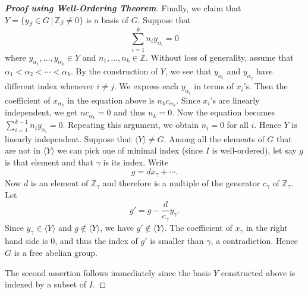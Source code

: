 \begin{proof}[\textbf{Proof using Well-Ordering Theorem}]
	Finally, we claim that $Y = \{y_\beta\in G\,|\, \mathbb{Z}_\beta \neq 0\}$ is a basis of $G$. Suppose that $$\sum_{i=1}^k n_{i}y_{\alpha_i} = 0$$
	where $y_{\alpha_1}, \dots, y_{\alpha_k}\in Y$ and $n_1,\dots, n_k\in\mathbb{Z}$. Without loss of generality, assume that $\alpha_1<\alpha_2<\cdots < \alpha_k$. By the construction of $Y$, we see that $y_{\alpha_i}$ and $y_{\alpha_j}$ have different index whenever $i\neq j$. We express each $y_{\alpha_i}$ in terms of $x_i$'s. Then the coefficient of $x_{\alpha_k}$ in the equation above is $n_kc_{\alpha_k}$. Since $x_i$'s are linearly independent, we get $nc_{\alpha_k} = 0$ and thus $n_k = 0$. Now the equation becomes $\sum_{i=1}^{k-1} n_{i}y_{\alpha_i} = 0$. Repeating this argument, we obtain $n_i = 0$ for all $i$.  Hence $Y$ is linearly independent. Suppose that  $\langle Y\rangle \ne G$. Among all the elements of $G$ that are not in $\langle Y\rangle$ we can pick one of minimal index (since $I$ is well-ordered), let say $g$ is that element and that $\gamma$ is its index. Write
	\[ g = d x_\gamma + \cdots. \]
	Now $d$ is an element of $\mathbb{Z}_\gamma$ and therefore is a multiple of the generator $c_{\gamma}$ of $\mathbb{Z}_\gamma$. Let 
	\begin{equation*}
		g' = g - \frac{d}{c_{\gamma}}y_\gamma.
	\end{equation*}  Since $y_\gamma \in \langle Y\rangle$ and $g\not\in \langle Y\rangle$, we have $g'\not\in \langle Y\rangle$. The coefficient of $x_\gamma$ in the right hand side is $0$, and thus the index of $g'$ is smaller than $\gamma$, a contradiction. Hence $G$ is a free abelian group. 
	
	The second assertion follows immediately since the basis $Y$ constructed above is indexed by a subset of $I$.
\end{proof}
